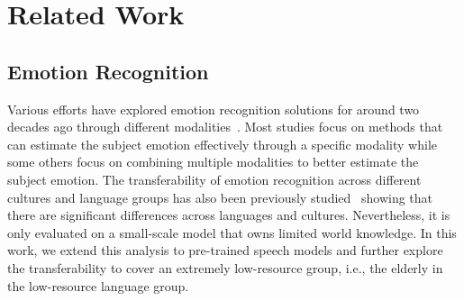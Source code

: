 \documentclass{INTERSPEECH2023}
\newcommand{\pascale}[1]{\textcolor{red}{#1}}
\begin{document}


\section{Related Work}

\subsection{Emotion Recognition}
Various efforts have explored emotion recognition solutions for around two decades ago through different modalities~\cite{martnez2005emot-ai,bertero2016multimodalhumor,cen2010speechemot,bertero2017speechemot,lovenia2022did,latif2022aiemot,dai2021weaklysupervised,dai2021mm-emot,lubis2014construction,lubis2016emotion}. Most studies focus on methods that can estimate the subject emotion effectively through a specific modality while some others focus on combining multiple modalities to better estimate the subject emotion. 
The transferability of emotion recognition across different cultures and language groups has also been previously studied~\cite{hareli2015crosscultural,lim2016cultural,iosifov2022serlangtrans} showing that there are significant differences across languages and cultures.
Nevertheless, it is only evaluated on a small-scale model that owns limited world knowledge. In this work, we extend this analysis to pre-trained speech models and further explore the transferability to cover an extremely low-resource group, i.e., the elderly in the low-resource language group.

\end{document}
